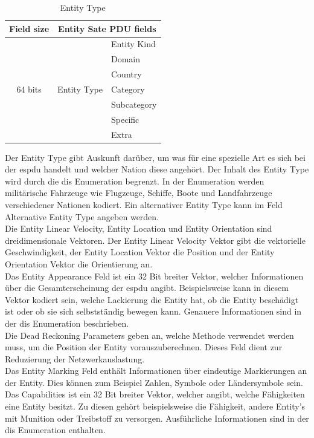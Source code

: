 \begin{table}[H]
	\centering
	\begin{tabular}{|c|c|l|}
		\hline
		Field size               & \multicolumn{2}{c|}{Entity Sate PDU fields} \\ \hline
		\multirow{7}{*}{64 bits} & \multirow{7}{*}{Entity Type}  & Entity Kind \\ \cline{3-3} 
		&                               & Domain      \\ \cline{3-3} 
		&                               & Country     \\ \cline{3-3} 
		&                               & Category    \\ \cline{3-3} 
		&                               & Subcategory \\ \cline{3-3} 
		&                               & Specific    \\ \cline{3-3} 
		&                               & Extra       \\ \hline
	\end{tabular}
\caption[Entity Type ]{Entity Type\cite{SISOStandardsActivityCommitteeoftheIEEEComputerSociety.}}
\label{type}

\end{table}
Der Entity Type gibt Auskunft darüber, um was für eine spezielle Art es sich bei der \ac{espdu} handelt und welcher Nation diese angehört. Der Inhalt des Entity Type wird durch die \ac{dis} Enumeration begrenzt. In der Enumeration werden militärische Fahrzeuge wie Flugzeuge, Schiffe, Boote und Landfahrzeuge verschiedener Nationen kodiert. Ein alternativer Entity Type kann im Feld \glqq Alternative Entity Type\grqq{} angeben werden.\\
Die  \glqq Entity Linear Velocity\grqq{}, \glqq Entity Location\grqq{} und \glqq Entity Orientation\grqq{} sind  dreidimensionale Vektoren. Der  \glqq Entity Linear Velocity\grqq{} Vektor gibt die vektorielle Geschwindigkeit, der \glqq Entity Location\grqq{} Vektor die Position und der \glqq Entity Orientation\grqq{} Vektor die Orientierung an. \\
Das  \glqq Entity Appearance\grqq{} Feld ist ein 32 Bit breiter Vektor, welcher Informationen über die Gesamterscheinung der \ac{espdu} angibt. Beispielsweise kann in diesem Vektor kodiert sein, welche Lackierung die Entity hat, ob die Entity beschädigt ist oder ob sie sich selbstständig bewegen kann. Genauere Informationen sind in der \ac{dis} Enumeration beschrieben.\\
 Die  \glqq Dead Reckoning Parameters\grqq{}  geben an, welche Methode verwendet werden muss, um die Position der Entity vorauszuberechnen. Dieses Feld dient zur Reduzierung der Netzwerkauslastung.\\
 Das \glqq Entity Marking\grqq{} Feld enthält Informationen über eindeutige Markierungen an der Entity. Dies können zum Beispiel Zahlen, Symbole oder Ländersymbole sein.\\ Das \glqq Capabilities\grqq{} ist ein 32 Bit breiter Vektor, welcher angibt, welche Fähigkeiten eine Entity besitzt. Zu diesen  gehört beispielsweise die 
Fähigkeit, andere Entity's mit Munition oder Treibstoff zu versorgen. Ausführliche Informationen sind in der \ac{dis} Enumeration enthalten.

